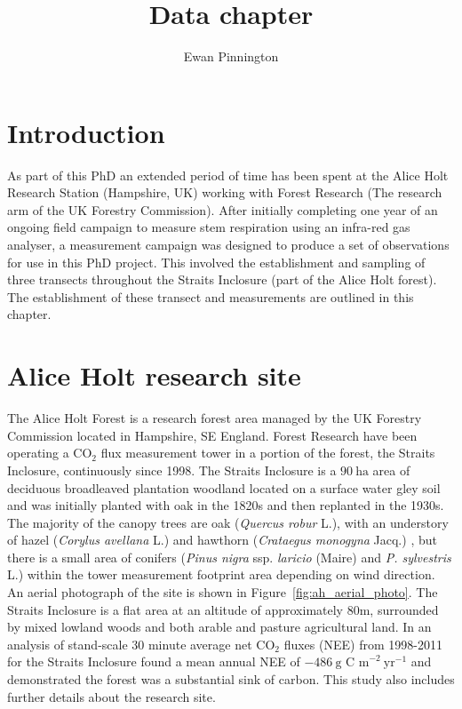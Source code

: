 \documentclass[11pt]{article}
\title{Data chapter}
\author{Ewan Pinnington}
\begin{document}
\maketitle

\section{Introduction}

As part of this PhD an extended period of time has been spent at the Alice Holt Research Station (Hampshire, UK) working with Forest Research (The research arm of the UK Forestry Commission). After initially completing one year of an ongoing field campaign to measure stem respiration using an infra-red gas analyser, a measurement campaign was designed to produce a set of observations for use in this PhD project. This involved the establishment and sampling of three transects throughout the Straits Inclosure (part of the Alice Holt forest). The establishment of these transect and measurements are outlined in this chapter.


\section{Alice Holt research site}

The Alice Holt Forest is a research forest area managed by the UK Forestry Commission located in Hampshire, SE England. Forest Research have been operating a $\text{CO}_{2}$ flux measurement tower in a portion of the forest, the Straits Inclosure, continuously since 1998. The Straits Inclosure is a $90~\text{ha}$ area of deciduous broadleaved plantation woodland located on a surface water gley soil and was initially planted with oak in the 1820s \citep{schlich1905working} and then replanted in the 1930s. The majority of the canopy trees are oak (\textit{Quercus robur} L.), with an understory of hazel (\textit{Corylus avellana} L.) and hawthorn (\textit{Crataegus monogyna} Jacq.) \citep{pitman2001leaf}, but there is a small area of conifers (\textit{Pinus nigra} ssp. \textit{laricio} (Maire) and \textit{P. sylvestris} L.) within the tower measurement footprint area depending on wind direction. An aerial photograph of the site is shown in Figure~\ref{fig:ah_aerial_photo}. The Straits Inclosure is a flat area at an altitude of approximately 80m, surrounded by mixed lowland woods and both arable and pasture agricultural land. In \citet{wilkinson2012inter} an analysis of stand-scale $30$ minute average net $\text{CO}_{2}$ fluxes (NEE) from 1998-2011 for the Straits Inclosure found a mean annual NEE of \(-486~\text{g C m}^{-2}~\text{yr}^{-1}\) and demonstrated the forest was a substantial sink of carbon. This study also includes further details about the research site. 
\end{document}
